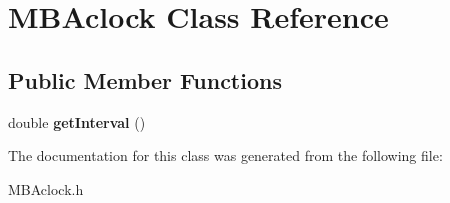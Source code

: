 \section{MBAclock Class Reference}
\label{classMBAclock}
\subsection*{Public Member Functions}
\begin{DoxyCompactItemize}
\item 
double {\bfseries getInterval} ()\label{classMBAclock_acbd9b9b686b9cf0062166e745beff006}

\end{DoxyCompactItemize}


The documentation for this class was generated from the following file:\begin{DoxyCompactItemize}
\item 
MBAclock.h\end{DoxyCompactItemize}
